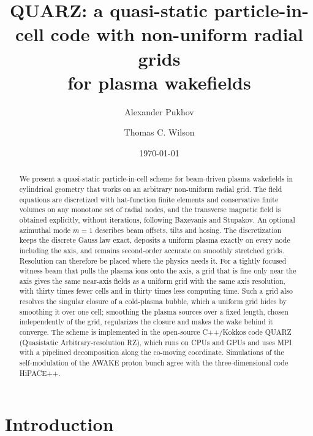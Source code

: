 \documentclass[aps,prab,reprint,floatfix,superscriptaddress,amsmath,amssymb]{revtex4-2}
\begin{document}
\title{QUARZ: a quasi-static particle-in-cell code with non-uniform radial grids\\ for plasma wakefields}

\author{Alexander Pukhov}
\author{Thomas C. Wilson}

\date{\today}

\begin{abstract}
We present a quasi-static particle-in-cell scheme for beam-driven plasma wakefields in cylindrical geometry that works on an arbitrary non-uniform radial grid. The field equations are discretized with hat-function finite elements and conservative finite volumes on any monotone set of radial nodes, and the transverse magnetic field is obtained explicitly, without iterations, following Baxevanis and Stupakov. An optional azimuthal mode $m=1$ describes beam offsets, tilts and hosing. The discretization keeps the discrete Gauss law exact, deposits a uniform plasma exactly on every node including the axis, and remains second-order accurate on smoothly stretched grids. Resolution can therefore be placed where the physics needs it. For a tightly focused witness beam that pulls the plasma ions onto the axis, a grid that is fine only near the axis gives the same near-axis fields as a uniform grid with the same axis resolution, with thirty times fewer cells and in thirty times less computing time. Such a grid also resolves the singular closure of a cold-plasma bubble, which a uniform grid hides by smoothing it over one cell; smoothing the plasma sources over a fixed length, chosen independently of the grid, regularizes the closure and makes the wake behind it converge. The scheme is implemented in the open-source C++/Kokkos code QUARZ (Quasistatic Arbitrary-resolution RZ), which runs on CPUs and GPUs and uses MPI with a pipelined decomposition along the co-moving coordinate. Simulations of the self-modulation of the AWAKE proton bunch agree with the three-dimensional code HiPACE++.
\end{abstract}

\maketitle

\section{Introduction}
\end{document}
